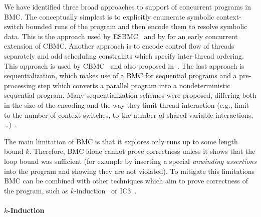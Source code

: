 
We have identified three broad approaches to support of concurrent programs in
BMC.
The conceptually simplest is to explicitly enumerate symbolic context-switch
bounded runs of the program and then encode them to resolve symbolic data.
This is the approach used by ESBMC~\cite{Cordeiro2011} and by
\cite{Rabinovitz2005} for an early concurrent extension of CBMC.
Another approach is to encode control flow of threads separately and add scheduling constraints which specify inter-thread ordering.
This approach is used by CBMC~\cite{Alglave2013po} and also proposed in~\cite{Ganai2008}.
The last approach is sequentialization, which makes use of a BMC for sequential programs and a pre-processing step which converts a parallel program into a nondeterministic sequential program.
Many sequentialization schemes were proposed, differing both in the size of the encoding and the way they limit thread interaction (e.g., limit to the number of context switches, to the number of shared-variable interactions, …)~\cite{Qadeer2004?,TODO...}.

The main limitation of BMC is that it explores only runs up to some length
bound $k$.
Therefore, BMC alone cannot prove correctness unless it shows that the loop
bound was sufficient (for example by inserting a special \emph{unwinding
assertions} into the program and showing they are not violated).
To mitigate this limitations BMC can be combined with other techniques which
aim to prove correctness of the program, such as $k$-induction~\cite{TODO} or
IC3~\cite{TODO}.

\paragraph{$k$-Induction}

